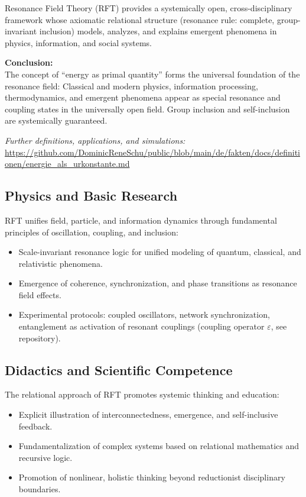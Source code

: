 \documentclass[12pt]{iopart}
\begin{document}
Resonance Field Theory (RFT) provides a systemically open, cross-disciplinary framework whose axiomatic relational structure (resonance rule: complete, group-invariant inclusion) models, analyzes, and explains emergent phenomena in physics, information, and social systems.

\textbf{Conclusion:}\\
The concept of “energy as primal quantity” forms the universal foundation of the resonance field: Classical and modern physics, information processing, thermodynamics, and emergent phenomena appear as special resonance and coupling states in the universally open field. Group inclusion and self-inclusion are systemically guaranteed.

\textit{Further definitions, applications, and simulations:}\\
\url{https://github.com/DominicReneSchu/public/blob/main/de/fakten/docs/definitionen/energie_als_urkonstante.md}

\subsection{Physics and Basic Research}

RFT unifies field, particle, and information dynamics through fundamental principles of oscillation, coupling, and inclusion:
\begin{itemize}
	\item Scale-invariant resonance logic for unified modeling of quantum, classical, and relativistic phenomena.
	\item Emergence of coherence, synchronization, and phase transitions as resonance field effects.
	\item Experimental protocols: coupled oscillators, network synchronization, entanglement as activation of resonant couplings (coupling operator $\varepsilon$, see repository).
\end{itemize}

\subsection{Didactics and Scientific Competence}

The relational approach of RFT promotes systemic thinking and education:
\begin{itemize}
	\item Explicit illustration of interconnectedness, emergence, and self-inclusive feedback.
	\item Fundamentalization of complex systems based on relational mathematics and recursive logic.
	\item Promotion of nonlinear, holistic thinking beyond reductionist disciplinary boundaries.
\end{itemize}
\end{document}
